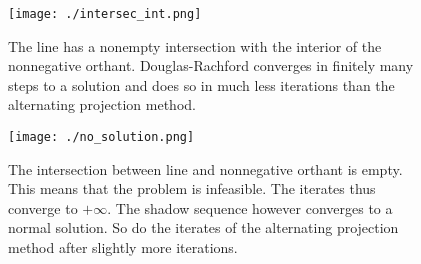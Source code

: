 \documentclass{scrartcl}
\theoremstyle{plain}
\theoremstyle{remark}
\begin{document}
\begin{figure}%
  \texttt{[image: ./intersec\_int.png]}
  \centering
  \caption{The line has a nonempty intersection with the interior of the nonnegative orthant. Douglas-Rachford converges in finitely many steps to a solution and does so in much less iterations than the alternating projection method.}
\end{figure}

\begin{figure}%
  \texttt{[image: ./no\_solution.png]}
  \centering
  \caption{The intersection between line and nonnegative orthant is empty. This means that the problem is infeasible. The iterates thus converge to $+\infty$. The shadow sequence however converges to a normal solution. So do the iterates of the alternating projection method after slightly more iterations.} 
\end{figure}
\end{document}
